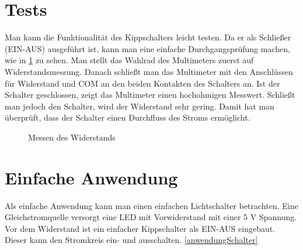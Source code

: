 \section{Tests}
Man kann die Funktionalität des Kippschalters leicht testen. Da er als Schließer (EIN-AUS) ausgeführt ist, kann man eine einfache Durchgangsprüfung machen, wie in \ref{skizzeWiderstandtest} zu sehen. Man stellt das Wahlrad des Multimeters zuerst auf Widerstandsmessung. Danach schließt man das Multimeter mit den Anschlüssen für Widerstand und COM an den beiden Kontakten des Schalters an. Ist der Schalter geschlossen, zeigt das Multimeter einen hochohmigen Messwert. Schließt man jedoch den Schalter, wird der Widerstand sehr gering. Damit hat man überprüft, dass der Schalter einen Durchfluss des Stroms ermöglicht.\cite{NKKswitches:2025} \cite{Fluke:2025}

\begin{figure}[H]
	\centering
	\caption{Messen des Widerstands}
	\label{skizzeWiderstandtest}
\end{figure}

\section{Einfache Anwendung}
Als einfache Anwendung kann man einen einfachen Lichtschalter betrachten. Eine Gleichstromquelle versorgt eine LED mit Vorwiderstand mit einer 5 V Spannung. Vor dem Widerstand ist ein einfacher Kippschalter als EIN-AUS eingebaut. Dieser kann den Stromkreis ein- und ausschalten. \ref{anwendungSchalter}


